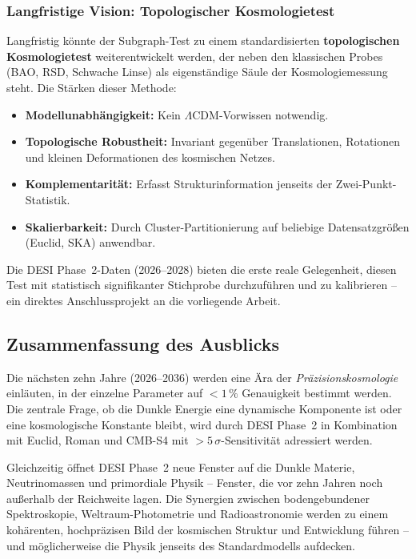﻿\documentclass[a4paper,12pt]{article}
\theoremstyle{definition}
\theoremstyle{remark}
\begin{document}
\subsubsection*{Langfristige Vision: Topologischer Kosmologietest}

Langfristig könnte der Subgraph-Test zu einem standardisierten
\textbf{topologischen Kosmologietest} weiterentwickelt werden, der
neben den klassischen Probes (BAO, RSD, Schwache Linse) als eigenständige
Säule der Kosmologiemessung steht. Die Stärken dieser Methode:

\begin{itemize}
  \item \textbf{Modellunabhängigkeit:} Kein $\Lambda$CDM-Vorwissen notwendig.
  \item \textbf{Topologische Robustheit:} Invariant gegenüber Translationen,
    Rotationen und kleinen Deformationen des kosmischen Netzes.
  \item \textbf{Komplementarität:} Erfasst Strukturinformation jenseits
    der Zwei-Punkt-Statistik.
  \item \textbf{Skalierbarkeit:} Durch Cluster-Partitionierung auf beliebige
    Datensatzgrößen (Euclid, SKA) anwendbar.
\end{itemize}

Die DESI Phase~2-Daten (2026--2028) bieten die erste reale Gelegenheit,
diesen Test mit statistisch signifikanter Stichprobe durchzuführen
und zu kalibrieren -- ein direktes Anschlussprojekt an die vorliegende Arbeit.

\subsection{Zusammenfassung des Ausblicks}

Die nächsten zehn Jahre (2026--2036) werden eine Ära der \textit{Präzisionskosmologie}
einläuten, in der einzelne Parameter auf $< 1\,\%$ Genauigkeit bestimmt werden.
Die zentrale Frage, ob die Dunkle Energie eine dynamische Komponente ist oder
eine kosmologische Konstante bleibt, wird durch DESI Phase~2 in Kombination
mit Euclid, Roman und CMB-S4 mit $> 5\,\sigma$-Sensitivität adressiert werden.

Gleichzeitig öffnet DESI Phase~2 neue Fenster auf die Dunkle Materie,
Neutrinomassen und primordiale Physik -- Fenster, die vor zehn Jahren noch
außerhalb der Reichweite lagen. Die Synergien zwischen bodengebundener
Spektroskopie, Weltraum-Photometrie und Radioastronomie werden zu einem
kohärenten, hochpräzisen Bild der kosmischen Struktur und Entwicklung
führen -- und möglicherweise die Physik jenseits des Standardmodells aufdecken.
\end{document}
